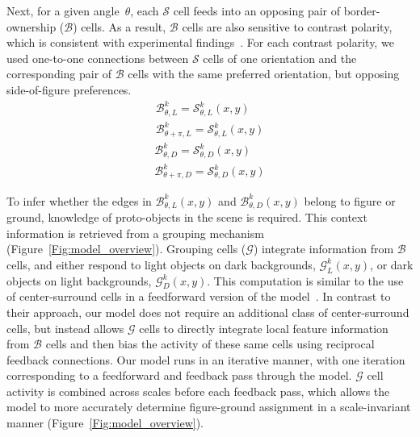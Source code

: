 Next, for a given angle~$\theta$, each $\mathcal{S}$ cell feeds into an opposing pair of border-ownership ($\mathcal{B}$) cells. As a result, $\mathcal{B}$ cells are also sensitive to contrast polarity, which is consistent with experimental findings~\citep{Zhou_etal00}.
For each contrast polarity, we used one-to-one connections between $\mathcal{S}$ cells of one orientation and the corresponding pair of
$\mathcal{B}$ cells with the same preferred orientation, but opposing side-of-figure preferences.
\begin{equation}
\begin{split}
\mathcal{B}^k_{\theta,L} = \mathcal{S}^k_{\theta,L}(x,y)\\
\mathcal{B}^k_{\theta+\pi,L} = \mathcal{S}^k_{\theta,L}(x,y)
\end{split}
\end{equation}
\begin{equation}
\begin{split}
\mathcal{B}^k_{\theta,D} = \mathcal{S}^k_{\theta,D}(x,y)\\
\mathcal{B}^k_{\theta+\pi,D} = \mathcal{S}^k_{\theta,D}(x,y)
\end{split}
\end{equation}

To infer whether the edges in $\mathcal{B}^k_{\theta,L}(x,y)$ and $\mathcal{B}^k_{\theta,D}(x,y)$ belong to figure or ground, knowledge of proto-objects in the scene is required. This context information is retrieved from a grouping mechanism (Figure~\ref{Fig:model_overview}). Grouping cells ($\mathcal{G}$) integrate information from $\mathcal{B}$
cells, and either respond to light objects on dark backgrounds, $\mathcal{G}^k_{L}(x,y)$, or dark objects on light backgrounds, $\mathcal{G}^k_{D}(x,y)$. This computation is similar to the use of center-surround cells in a feedforward version of the model~\citep{Russell_etal14}. In contrast to their approach, our model does not require an additional class of center-surround cells, but instead allows $\mathcal{G}$ cells to directly integrate local feature information from $\mathcal{B}$ cells and then bias the activity of these same cells using reciprocal feedback connections. Our model runs in an iterative manner, with one iteration corresponding to a feedforward and feedback pass through the model. $\mathcal{G}$ cell activity is combined across scales before each feedback pass, which allows the model to more accurately determine figure-ground assignment in a scale-invariant manner (Figure~\ref{Fig:model_overview}).

